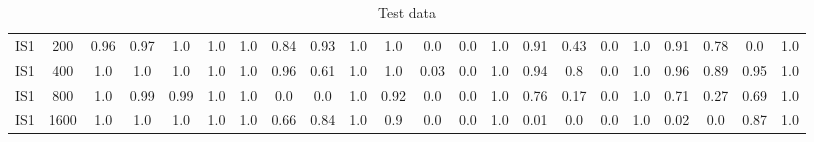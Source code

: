 \documentclass[10pt]{article}
\begin{document}
\begin{table}
\begin{tabular}{ cc||c c c c | c c c c | c c c c | c c c c| c c c c}
 					IS1 & 200 & 0.96 & 0.97 & 1.0 & 1.0 & 1.0 & 0.84 & 0.93 & 1.0& 1.0 & 0.0 & 0.0 & 1.0& 0.91 & 0.43 & 0.0 & 1.0 & 0.91 & 0.78 & 0.0 & 1.0\\ 
 					IS1 & 400 & 1.0 & 1.0 & 1.0 & 1.0 & 1.0 & 0.96 & 0.61 & 1.0& 1.0 & 0.03 & 0.0 & 1.0& 0.94 & 0.8 & 0.0 & 1.0 & 0.96 & 0.89 & 0.95 & 1.0\\ 
 					IS1 & 800 & 1.0 & 0.99 & 0.99 & 1.0 & 1.0 & 0.0 & 0.0 & 1.0& 0.92 & 0.0 & 0.0 & 1.0& 0.76 & 0.17 & 0.0 & 1.0 & 0.71 & 0.27 & 0.69 & 1.0\\ 
 					IS1 & 1600 & 1.0 & 1.0 & 1.0 & 1.0 & 1.0 & 0.66 & 0.84 & 1.0& 0.9 & 0.0 & 0.0 & 1.0& 0.01 & 0.0 & 0.0 & 1.0 & 0.02 & 0.0 & 0.87 & 1.0\\ \hline
 \hline
  \end{tabular}
  \caption{Test data}
\end{table}


\newpage
\end{document}
